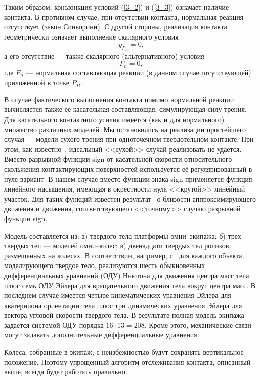 Таким образом, конъюнкция условий (\ref{3_2}) и (\ref{3_3}) означает наличие
контакта. В противном случае, при отсутствии контакта, нормальная реакция 
отсутствует (закон Синьорини). С другой стороны, реализация контакта 
геометрически означает выполнение скалярного условия 
\begin{equation}
y_{P_B}=0,
\label{3_4}
\end{equation}
а его отсутствие --- также скалярного (альтернативного) условия
$$
F_n=0,
$$
где $F_n$ --- нормальная составляющая реакции (в данном случае отсутствующей) 
приложенной в точке $P_B$.

В случае фактического выполнения контакта помимо нормальной реакции вычисляется
также её касательная составляющая, симулирующая силу трения. Для касательного 
контактного усилия имеется (как и для нормального) множество различных моделей. 
Мы остановились на реализации простейшего случая --- модели сухого трения при 
одноточечном твердотельном контакте. При этом, как известно~\cite{Novozhilov1991}, 
идеальный <<сухой>> случай реализовать не удается. Вместо разрывной функции 
sign от касательной скорости относительного скольжения контактирующих 
поверхностей используется её регуляризованный в нуле вариант. В нашем случае 
вместо функции знака sign применяется функция линейного насыщения, имеющая в 
окрестности нуля <<крутой>> линейный участок. Для таких функций известен 
результат~\cite{Novozhilov1991} о близости аппроксимирующего движения и движения, 
соответствующего <<точному>> случаю разрывной функции sign.



Модель составляется из: а) твердого тела платформы
омни--экипажа; б) трех твердых тел --- моделей омни--колес; в) двенадцати 
твердых тел роликов, размещенных на колесах. В соответствии, например, 
с~\cite{Kosenko2007} для каждого объекта, моделирующего твердое тело, 
реализуются шесть обыкновенных дифференциальных уравнений (ОДУ) Ньютона для
движения центра масс тела плюс семь ОДУ Эйлера для вращательного движения тела
вокруг центра масс. В последнем случае имеется четыре кинематических уравнения
Эйлера для кватерниона ориентации тела плюс три динамических уравнения Эйлера
для вектора угловой скорости твердого тела. В результате полная модель экипажа
задается системой ОДУ порядка $16\cdot 13=208$. Кроме этого, механические связи
могут задавать дополнительные дифференциальные уравнения.

Колеса, собранные в экипаж, с неизбежностью будут сохранять вертикальное 
положение. Поэтому упрощенный алгоритм отслеживания контакта, описанный выше,
всегда будет работать правильно.

